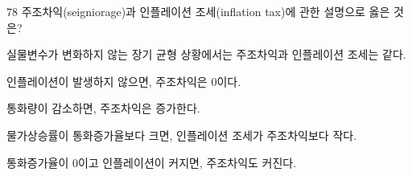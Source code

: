 \begin{question}{78}
주조차익(seigniorage)과 인플레이션 조세(inflation tax)에 관한 설명으로 옳은 것은?
\begin{choices}
  \item 실물변수가 변화하지 않는 장기 균형 상황에서는 주조차익과 인플레이션 조세는 같다.
  \item 인플레이션이 발생하지 않으면, 주조차익은 0이다.
  \item 통화량이 감소하면, 주조차익은 증가한다.
  \item 물가상승률이 통화증가율보다 크면, 인플레이션 조세가 주조차익보다 작다.
  \item 통화증가율이 0이고 인플레이션이 커지면, 주조차익도 커진다.
\end{choices}
\end{question}
